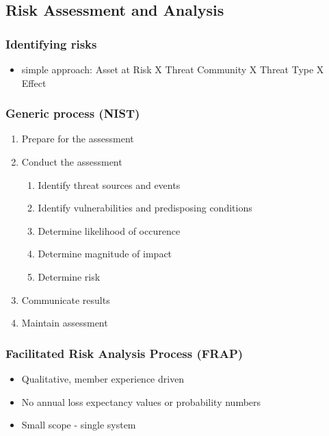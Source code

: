 \documentclass[11pt]{article}
\begin{document}
\subsection{Risk Assessment and Analysis}
\label{sec:orgcd160ce}
\subsubsection{Identifying risks}
\label{sec:org80ca5cd}
\begin{itemize}
\item simple approach: Asset at Risk X Threat Community X Threat Type X Effect
\end{itemize}
\subsubsection{Generic process (NIST)}
\label{sec:org1575516}
\begin{enumerate}
\item Prepare for the assessment
\label{sec:orga4dbb97}
\item Conduct the assessment
\label{sec:orgcb03344}
\begin{enumerate}
\item Identify threat sources and events
\label{sec:orgdc1dad2}
\item Identify vulnerabilities and predisposing conditions
\label{sec:org80f3907}
\item Determine likelihood of occurence
\label{sec:org2f25025}
\item Determine magnitude of impact
\label{sec:orga34747c}
\item Determine risk
\label{sec:org7971c13}
\end{enumerate}
\item Communicate results
\label{sec:orgb30ff27}
\item Maintain assessment
\label{sec:org9ce58fd}
\end{enumerate}
\subsubsection{Facilitated Risk Analysis Process (FRAP)}
\label{sec:org5440f54}
\begin{itemize}
\item Qualitative, member experience driven
\item No annual loss expectancy values or probability numbers
\item Small scope - single system
\end{itemize}
\end{document}
